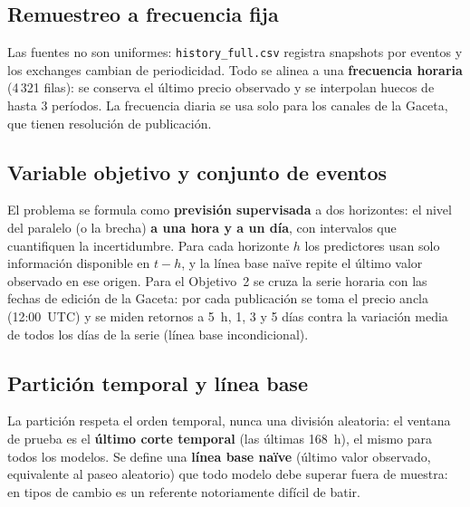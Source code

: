 \subsection{Remuestreo a frecuencia fija}

Las fuentes no son uniformes: \texttt{history\_full.csv} registra snapshots
por eventos y los exchanges cambian de periodicidad. Todo se alinea a una
\textbf{frecuencia horaria} (4\,321 filas): se conserva el último precio
observado y se interpolan huecos de hasta 3 períodos. La frecuencia diaria se usa
solo para los canales de la Gaceta, que tienen resolución de publicación.


\subsection{Variable objetivo y conjunto de eventos}

El problema se formula como \textbf{previsión supervisada} a dos horizontes:
el nivel del paralelo (o la brecha) \textbf{a una hora y a un día}, con
intervalos que cuantifiquen la incertidumbre. Para cada horizonte $h$ los
predictores usan solo información disponible en $t-h$, y la línea base naïve
repite el último valor observado en ese origen. Para el Objetivo~2 se cruza la serie horaria con las fechas de
edición de la Gaceta: por cada publicación se toma el precio ancla (12:00~UTC)
y se miden retornos a 5~h, 1, 3 y 5 días contra la variación media de todos los
días de la serie (línea base incondicional).

\subsection{Partición temporal y línea base}

La partición respeta el orden temporal, nunca una división aleatoria: el
ventana de prueba es el \textbf{último corte temporal} (las últimas 168~h), el mismo
para todos los modelos. Se define una
\textbf{línea base naïve} (último valor observado, equivalente al paseo
aleatorio) que todo modelo debe superar fuera de muestra: en tipos de cambio
es un referente notoriamente difícil de batir.
